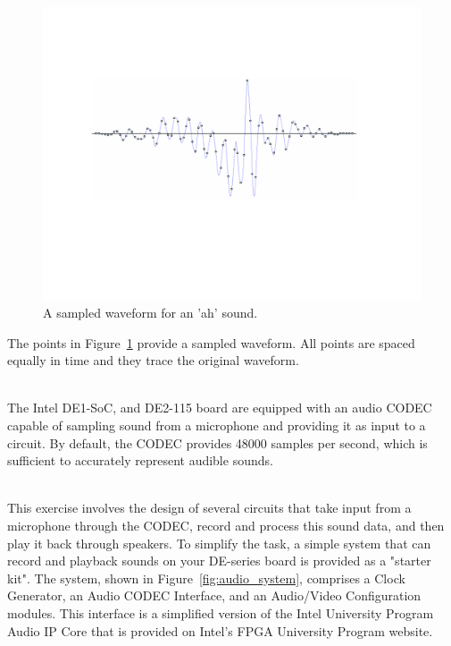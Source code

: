\documentclass[epsfig,10pt,fullpage]{article}
\begin{document}
\begin{figure}[H]
\centering
\includegraphics[width=4.5in]{figures/sampled_waveform.pdf}
\caption{A sampled waveform for an 'ah' sound.}
\label{fig:sampled_waveform}
\end{figure}

The points in Figure~\ref{fig:sampled_waveform} provide a sampled waveform. All points are spaced 
equally in time and they trace the original waveform.

~\\
The Intel DE1-SoC, and DE2-115 board are equipped with an audio CODEC capable of sampling sound from a microphone and providing it
as input to a circuit. By default, the CODEC provides 48000 samples per second, which is sufficient to accurately represent
audible sounds.

~\\
This exercise involves the design of several circuits that take input from a microphone
through the CODEC, record and process this sound data, and then play it back through 
speakers. To simplify the task, a simple system that can record and playback sounds on
your DE-series board is provided as a "starter kit". The system, shown in 
Figure~\ref{fig:audio_system}, comprises a {\sf Clock Generator}, an
{\sf Audio CODEC Interface}, and an {\sf Audio/Video Configuration} modules. This interface is 
a simplified version of the Intel
University Program Audio IP Core that is provided on Intel's FPGA University Program website.
\end{document}
